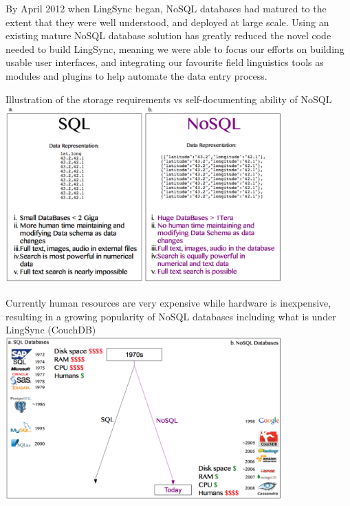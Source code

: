 \documentclass[12pt]{article}
\begin{document}
By April 2012 when LingSync began, NoSQL databases had matured to the extent that they were well understood, and deployed at large scale. 
Using an existing mature NoSQL database solution has greatly reduced the novel code needed to build LingSync, meaning we were able to focus our efforts on building usable user interfaces, and integrating our favourite field linguistics tools as modules and plugins to help automate the data entry process. 




\begin{exe}

  \ex   Illustration of the storage requirements vs self-documenting ability of NoSQL
  \centering
    \includegraphics[width=0.8\textwidth]{figures/whynosql}

\label{ex:whynosql}
\end{exe}


\begin{exe}

  \ex   Currently human resources are very expensive while hardware is inexpensive, resulting in a growing popularity of NoSQL databases including what is under LingSync (CouchDB)
  \centering
    \includegraphics[width=0.8\textwidth]{figures/databasetrends}

\label{ex:databasetrends}
\end{exe}
\end{document}
